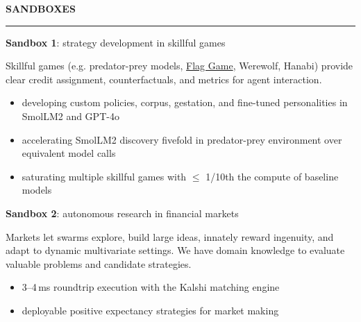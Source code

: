 \documentclass[12pt,letterpaper]{article}
\newcommand{\sect}[2][]{
\par\vspace{8pt}
{\color{accent}\small\bfseries\MakeUppercase{#2}}\hfill{\color{muted}\small#1}\par
\vspace{2pt}\nointerlineskip\vspace{2pt}
{\color{accent!35}\rule{\linewidth}{0.5pt}}
\par\vspace{-1pt}
}
\begin{document}
\sect{Sandboxes}

\textbf{Sandbox 1}: strategy development in skillful games

Skillful games (e.g. predator-prey models, \href{https://arxiv.org/pdf/2609.19124}{Flag Game}, Werewolf, Hanabi) provide clear credit assignment, counterfactuals, and metrics for agent interaction.

\begin{itemize}
  \item developing custom policies, corpus, gestation, and fine-tuned personalities in SmolLM2 and GPT-4o
  \item accelerating SmolLM2 discovery fivefold in predator-prey environment over equivalent model calls
  \item saturating multiple skillful games with $\leq$ 1/10th the compute of baseline models
\end{itemize}

\textbf{Sandbox 2}: autonomous research in financial markets

Markets let swarms explore, build large ideas, innately reward ingenuity, and adapt to dynamic multivariate settings. We have domain knowledge to evaluate valuable problems and candidate strategies.

\begin{itemize}
  \item 3--4\,ms roundtrip execution with the Kalshi matching engine
  \item deployable positive expectancy strategies for market making
\end{itemize}
\end{document}
